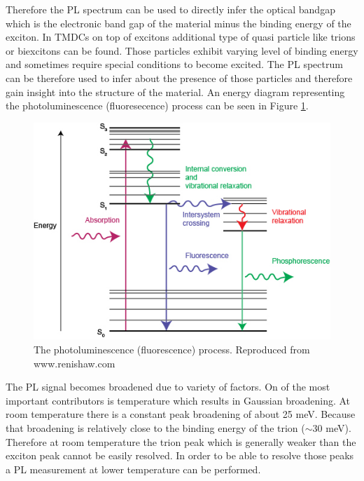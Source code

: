 Therefore the PL spectrum can be used to directly infer the optical bandgap which is the electronic band gap of the material minus the binding energy of the exciton. In TMDCs on top of excitons additional type of quasi particle like trions or biexcitons can be found. Those particles exhibit varying level of binding energy and sometimes require special conditions to become excited. The PL spectrum can be therefore used to infer about the presence of those particles and therefore gain insight into the structure of the material. An energy diagram representing the photoluminescence (fluoresecence) process can be seen in Figure \ref{fig:MethodologyPLDiagram}.

\begin{figure}[!ht]
	\begin{center}
		\includegraphics[scale=0.7]{Methodology/PLDiagram.png}
		\caption{The photoluminescence (fluorescence) process. Reproduced from www.renishaw.com}
		\label{fig:MethodologyPLDiagram}
	\end{center}
\end{figure}

The PL signal becomes broadened due to variety of factors. On of the most important contributors is temperature which results in Gaussian broadening. At room temperature there is a constant peak broadening of about 25 meV. Because that broadening is relatively close to the binding energy of the trion ($\sim$30 meV). Therefore at room temperature the trion peak which is generally weaker than the exciton peak cannot be easily resolved. In order to be able to resolve those peaks a PL measurement at lower temperature can be performed.

